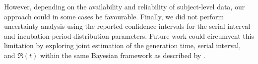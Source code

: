 However, depending on the availability and reliability of subject-level data,
our approach could in some cases be favourable.
Finally, we did not perform uncertainty analysis using
the reported confidence intervals for
the serial interval and incubation period distribution parameters.
Future work could circumvent this limitation by exploring
joint estimation of the generation time, serial interval, and $\Re(t)$
within the same Bayesian framework as described by \cite{Cori2013}.
